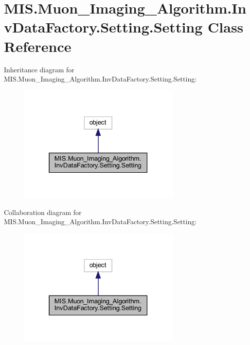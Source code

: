 \hypertarget{classMIS_1_1Muon__Imaging__Algorithm_1_1InvDataFactory_1_1Setting_1_1Setting}{}\section{M\+I\+S.\+Muon\+\_\+\+Imaging\+\_\+\+Algorithm.\+Inv\+Data\+Factory.\+Setting.\+Setting Class Reference}
\label{classMIS_1_1Muon__Imaging__Algorithm_1_1InvDataFactory_1_1Setting_1_1Setting}


Inheritance diagram for M\+I\+S.\+Muon\+\_\+\+Imaging\+\_\+\+Algorithm.\+Inv\+Data\+Factory.\+Setting.\+Setting\+:
\nopagebreak
\begin{figure}[H]
\begin{center}
\leavevmode
\includegraphics[width=231pt]{classMIS_1_1Muon__Imaging__Algorithm_1_1InvDataFactory_1_1Setting_1_1Setting__inherit__graph}
\end{center}
\end{figure}


Collaboration diagram for M\+I\+S.\+Muon\+\_\+\+Imaging\+\_\+\+Algorithm.\+Inv\+Data\+Factory.\+Setting.\+Setting\+:
\nopagebreak
\begin{figure}[H]
\begin{center}
\leavevmode
\includegraphics[width=231pt]{classMIS_1_1Muon__Imaging__Algorithm_1_1InvDataFactory_1_1Setting_1_1Setting__coll__graph}
\end{center}
\end{figure}
